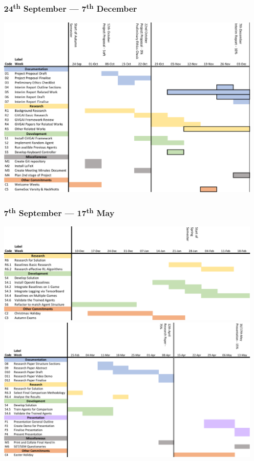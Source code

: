 \documentclass[a4paper]{article}
\begin{document}
\subsubsection{24\textsuperscript{th} September --- 7\textsuperscript{th} December}
\begin{center}
\includegraphics[width=17cm]{workPlan-7Dec.pdf} %
\end{center}
\subsubsection{7\textsuperscript{th} September --- 17\textsuperscript{th} May}
\begin{center}
\includegraphics[width=17cm]{workPlan-18Feb.pdf} %
\includegraphics[width=17cm]{workPlan-17May.pdf} %

\end{center}
\end{document}
